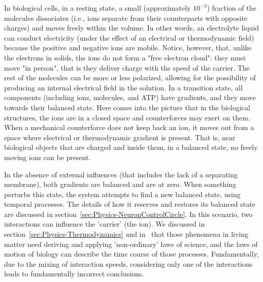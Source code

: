 In biological cells, in a resting state, a small (approximately $10^{-3}$) fraction of the molecules dissociates (i.e., ions separate from their counterparts with opposite charges) and moves freely within the volume.
In other words, an electrolyte liquid can conduct electricity (under the effect of an electrical or thermodynamic field) because the positive and negative ions are mobile. 
Notice, however, that, unlike the electrons in solids, the ions do not form a "free electron cloud": they must move "in person", that is
they deliver charge with the speed of the carrier.
The rest of the molecules can be more or less polarized, allowing for the possibility of producing an internal electrical field in the solution. 
In a transition state, all components (including ions, molecules, and \gls{ATP}) have gradients, and they move towards their balanced state.
Here comes into the picture that in the biological structures, the ions are in a closed space and counterforces
may exert on them. When a mechanical counterforce does not keep back
an ion, it moves out from a space where electrical or thermodynamic 
gradient is present. That is, near biological objects that are charged and inside them, in a balanced state, no freely moving ions can be present. 

\else

\fi


\ifx\magyar\undefined
In the absence of external influences (that includes the lack of a separating membrane),
both gradients are balanced and are at zero.
When something perturbs this state, the system attempts to find a 
new balanced state, using temporal processes.
The details of how it reserves and restores its balanced state
are discussed in section~\ref{sec:Physics-NeuronControlCircle}.
In this scenario, two interactions can influence the 'carrier' (the ion).
We discussed in section~\ref{sec:Physics-Thermodynamics} and in~\cite{VeghNon-ordinaryLaws:2025} that those phenomena in living matter 
need deriving and applying 'non-ordinary' laws of science, and the laws of motion of biology can describe the time course of those processes.
Fundamentally, due to the mixing of interaction speeds, considering only one of the interactions leads to fundamentally incorrect conclusions.



